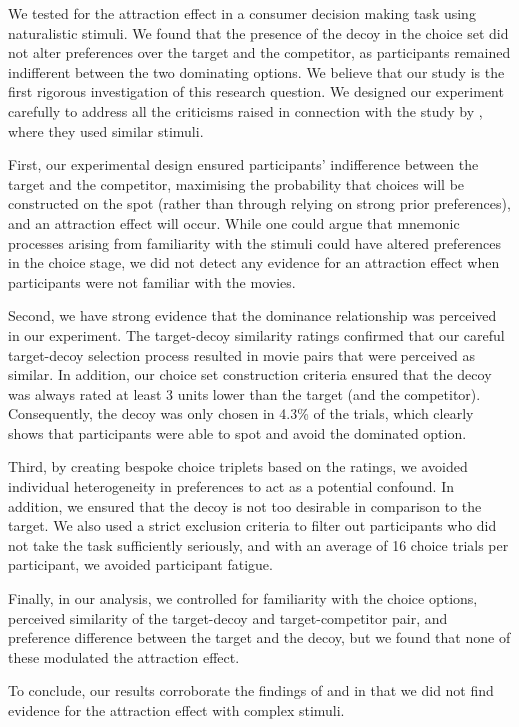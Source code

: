 \documentclass[12pt, a4paper]{article}
\begin{document}
We tested for the attraction effect in a consumer decision making task using naturalistic stimuli. We found that the presence of the decoy in the choice set did not alter preferences over the target and the competitor, as participants remained indifferent between the two dominating options. We believe that our study is the first rigorous investigation of this research question. We designed our experiment carefully to address all the criticisms raised in connection with the study by \citeauthor{Frederick2014}, where they used similar stimuli.

First, our experimental design ensured participants' indifference between the target and the competitor, maximising the probability that choices will be constructed on the spot (rather than through relying on strong prior preferences), and an attraction effect will occur. While one could argue that mnemonic processes arising from familiarity with the stimuli could have altered preferences in the choice stage, we did not detect any evidence for an attraction effect when participants were not familiar with the movies.

Second, we have strong evidence that the dominance relationship was perceived in our experiment. The target-decoy similarity ratings confirmed that our careful target-decoy selection process resulted in movie pairs that were perceived as similar. In addition, our choice set construction criteria ensured that the decoy was always rated at least 3 units lower than the target (and the competitor). Consequently, the decoy was only chosen in 4.3\% of the trials, which clearly shows that participants were able to spot and avoid the dominated option.

Third, by creating bespoke choice triplets based on the ratings, we avoided individual heterogeneity in preferences to act as a potential confound. In addition, we ensured that the decoy is not too desirable in comparison to the target. We also used a strict exclusion criteria to filter out participants who did not take the task sufficiently seriously, and with an average of 16 choice trials per participant, we avoided participant fatigue.


Finally, in our analysis, we controlled for familiarity with the choice options, perceived similarity of the target-decoy and target-competitor pair, and preference difference between the target and the decoy, but we found that none of these modulated the attraction effect.


To conclude, our results corroborate the findings of \citeauthor{Frederick2014} and \citeauthor{Yang2014} in that we did not find evidence for the attraction effect with complex stimuli.





\newpage


\end{document}
